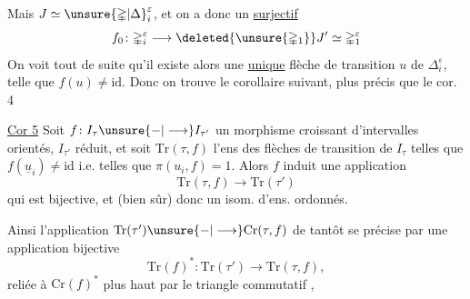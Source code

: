 
Mais $J\simeq\unsure{\mathbb{\Delta}|\Delta}_i^\varepsilon$, et on a donc un 
\uline{surjectif}
\[
 f_0\colon\mathbb{\Delta}_i^\varepsilon\longrightarrow\deleted{\unsure{\mathbb{\Delta}_1}}J'\simeq\mathbb{\Delta}_1^\varepsilon
\]
On voit tout de suite qu'il existe alors une
\uline{unique} flèche de  transition $u$ de
$\mathbb{\Delta}_i^\varepsilon$, telle que $f(u)\ne\mathrm{id}$. Donc on trouve
le corollaire suivant, plus précis que le
cor. 4

\uline{Cor 5} Soit $f\colon I_\tau\unsure{\mathbin{-}|\longrightarrow}I_{\tau'}$ un morphisme
croissant d'intervalles orientés,  $I_{\tau'}$
réduit, et soit $\mathrm{Tr}(\tau,f)$ l'ens des flèches de
transition  de $I_\tau$ telles que $f(\underline{u}_i)\ne\mathrm{id}$ i.e. telles
que  $\pi(u_i,f)=1$. Alors $f$ induit
une application
\[
\mathrm{Tr}(\tau,f)\longrightarrow\mathrm{Tr}(\tau')
\]
qui est bijective, et (bien sûr) 
donc un isom. d'ens. ordonnés.

Ainsi l'application $\mathrm{Tr}(\tau')\unsure{\mathbin{-}|\longrightarrow}\mathrm{Cr}(\tau,f)$ de
tantôt se précise par une application bijective
\[
\mathrm{Tr}(f)^*\colon\mathrm{Tr}(\tau')\longrightarrow\mathrm{Tr}(\tau,f),
\]
reliée à $\mathrm{Cr}(f)^*$ plus haut par le triangle
commutatif
,
